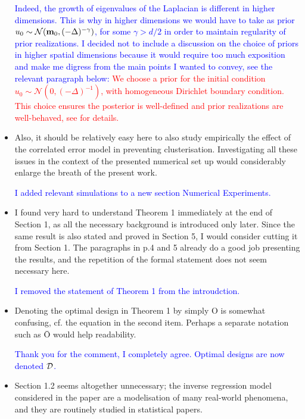 \documentclass{amsart}
\newcommand{\paste}[1]{\vskip 0.05in \textcolor{red}{#1}\vskip 0.05in}
\newcommand{\answer}[1]{\vskip 0.05in \textcolor{blue}{#1} \vskip 0.05in}
\begin{document}
\begin{itemize}
  \answer{Indeed, the growth of eigenvalues of the Laplacian is
    different in higher dimensions. This is why in higher dimensions
    we would have to take as prior \(u_0 \sim \mathcal{N}(\mathbf{m}_0,
    (-\Delta)^{-\gamma})\), for some \(\gamma > d/2\) in order to
    maintain regularity of prior realizations. I decided not to
    include a discussion on the choice of priors in higher spatial
    dimensions because it would require too much exposition and make
    me digress from the main points I wanted to convey, see the
    relevant paragraph below:}
  \paste{We choose a prior for the initial condition $u_0 \sim \mathcal{N}(0,
    (-\Delta)^{-1})$, with homogeneous Dirichlet boundary condition. This
    choice ensures the posterior is well-defined and prior realizations
    are well-behaved, see \cite[Theorem 3.1 and Lemma 6.25]{Stuart10} for
    details.}

  
\item Also, it should be relatively easy here to also study
  empirically the effect of the correlated error model in preventing
  clusterisation. Investigating all these issues in the context of the
  presented numerical set up would considerably enlarge the breath of
  the present work.

  \answer{I added relevant simulations to a new section Numerical
  Experiments.}

\item I found very hard to understand Theorem 1 immediately at the end
  of Section 1, as all the necessary background is introduced only
  later. Since the same result is also stated and proved in Section 5,
  I would consider cutting it from Section 1. The paragraphs in p.4
  and 5 already do a good job presenting the results, and the
  repetition of the formal statement does not seem necessary here.

  \answer{I removed the statement of Theorem 1 from the introudction.}

\item Denoting the optimal design in Theorem 1 by simply O is somewhat
  confusing, cf. the equation in the second item. Perhaps a separate
  notation such as Ō would help readability.

  \answer{Thank you for the comment, I completely agree. Optimal
  designs are now denoted $\mathcal{D}$.}
  
\item Section 1.2 seems altogether unnecessary; the inverse regression
  model considered in the paper are a modelisation of many real-world
  phenomena, and they are routinely studied in statistical papers.


\end{itemize}
\end{document}
